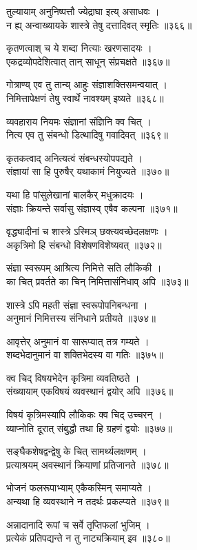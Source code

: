 तुल्यायाम् अनुनिष्पत्तौ ज्येद्राघा इत्य् असाधवः ।\\न ह्य् अन्वाख्यायके शास्त्रे तेषु दत्तादिवत् स्मृतिः ॥३६६॥

कृतणत्वाश् च ये शब्दा नित्याः खरणसादयः ।\\एकद्रव्योपदेशित्वात् तान् साधून् संप्रचक्षते ॥३६७॥

गोत्राण्य् एव तु तान्य् आहुः संज्ञाशक्तिसमन्वयात् ।\\निमित्तापेक्षणं तेषु स्वार्थे नावश्यम् इष्यते ॥३६८॥

व्यवहाराय नियमः संज्ञानां संज्ञिनि क्व चित् ।\\नित्य एव तु संबन्धो डित्थादिषु गवादिवत् ॥३६९॥

कृतकत्वाद् अनित्यत्वं संबन्धस्योपपद्यते ।\\संज्ञायां सा हि पुरुषैर् यथाकामं नियुज्यते ॥३७०॥

यथा हि पांसुलेखानां बालकैर् मधुक्रादयः ।\\संज्ञाः क्रियन्ते सर्वासु संज्ञास्व् एषैव कल्पना ॥३७१॥

वृद्ध्यादीनां च शास्त्रे ऽस्मिञ् छक्त्यवच्छेदलक्षणः ।\\अकृत्रिमो हि संबन्धो विशेषणविशेष्यवत् ॥३७२॥

संज्ञा स्वरूपम् आश्रित्य निमित्ते सति लौकिकी ।\\का चित् प्रवर्तते का चिन् निमित्तासंनिधाव् अपि ॥३७३॥

शास्त्रे ऽपि महती संज्ञा स्वरूपोपनिबन्धना ।\\अनुमानं निमित्तस्य संनिधाने प्रतीयते ॥३७४॥

आवृत्तेर् अनुमानं वा सारूप्यात् तत्र गम्यते ।\\शब्दभेदानुमानं वा शक्तिभेदस्य वा गतिः ॥३७५॥

क्व चिद् विषयभेदेन कृत्रिमा व्यवतिष्ठते ।\\संख्यायाम् एकविषयं व्यवस्थानं द्वयोर् अपि ॥३७६॥

विषयं कृत्रिमस्यापि लौकिकः क्व चिद् उच्चरन् ।\\व्याप्नोति दूरात् संबुद्धौ तथा हि ग्रहणं द्वयोः ॥३७७॥

सङ्घैकशेषद्वन्द्वेषु के चित् सामर्थ्यलक्षणम् ।\\प्रत्याश्रयम् अवस्थानं क्रियाणां प्रतिजानते ॥३७८॥

भोजनं फलरूपाभ्याम् एकैकस्मिन् समाप्यते ।\\अन्यथा हि व्यवस्थाने न तदर्थः प्रकल्प्यते ॥३७९॥

अन्नादानादि रूपां च सर्वे तृप्तिफलां भुजिम् ।\\प्रत्येकं प्रतिपद्यन्ते न तु नाट्यक्रियाम् इव ॥३८०॥


